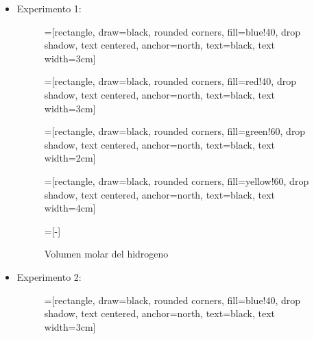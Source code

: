 \documentclass[../main.tex]{subfiles}
\begin{document}
\begin{itemize}
    \item Experimento 1:
    \begin{figure}[H]
        =[rectangle, draw=black, rounded corners, fill=blue!40, drop shadow, text centered, anchor=north, text=black, text width=3cm]
    
        =[rectangle, draw=black, rounded corners, fill=red!40, drop shadow, text centered, anchor=north, text=black, text width=3cm]
    
        =[rectangle, draw=black, rounded corners, fill=green!60, drop shadow, text centered, anchor=north, text=black, text width=2cm]
    
        =[rectangle, draw=black, rounded corners, fill=yellow!60, drop shadow, text centered, anchor=north, text=black, text width=4cm]
        
        =[-]
        
        \centering
        
        \caption{Volumen molar del hidrogeno}
        \label{fig:my_label}
    \end{figure}
    \item Experimento 2:
    \begin{figure}[H]
        =[rectangle, draw=black, rounded corners, fill=blue!40, drop shadow, text centered, anchor=north, text=black, text width=3cm]
    

\end{figure}
\end{itemize}
\end{document}
